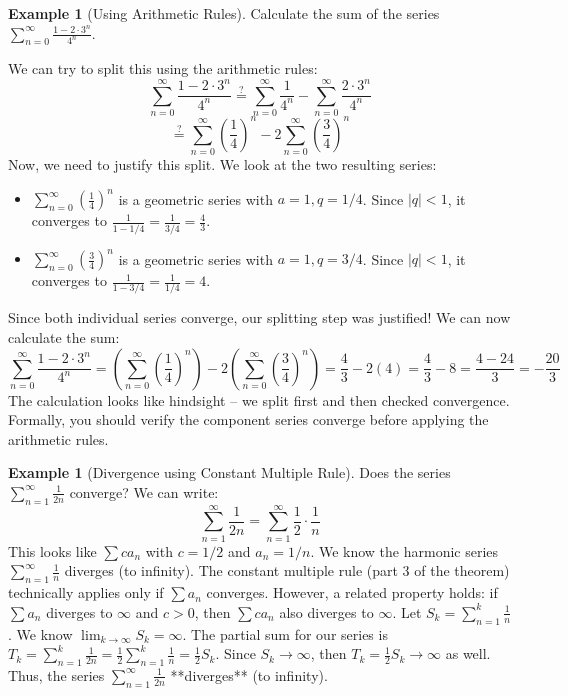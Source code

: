 \documentclass[11pt]{article}
\theoremstyle{definition}
\newtheorem{example}[theorem]{Example}
\theoremstyle{remark}
\begin{document}
\begin{example}[Using Arithmetic Rules]
Calculate the sum of the series $\sum_{n=0}^{\infty} \frac{1 - 2 \cdot 3^n}{4^n}$.

We can try to split this using the arithmetic rules:
\[ \sum_{n=0}^{\infty} \frac{1 - 2 \cdot 3^n}{4^n} \stackrel{?}{=} \sum_{n=0}^{\infty} \frac{1}{4^n} - \sum_{n=0}^{\infty} \frac{2 \cdot 3^n}{4^n} \]
\[ \stackrel{?}{=} \sum_{n=0}^{\infty} \left(\frac{1}{4}\right)^n - 2 \sum_{n=0}^{\infty} \left(\frac{3}{4}\right)^n \]
Now, we need to justify this split. We look at the two resulting series:
\begin{itemize}
    \item $\sum_{n=0}^{\infty} (\frac{1}{4})^n$ is a geometric series with $a=1, q=1/4$. Since $|q|<1$, it converges to $\frac{1}{1-1/4} = \frac{1}{3/4} = \frac{4}{3}$.
    \item $\sum_{n=0}^{\infty} (\frac{3}{4})^n$ is a geometric series with $a=1, q=3/4$. Since $|q|<1$, it converges to $\frac{1}{1-3/4} = \frac{1}{1/4} = 4$.
\end{itemize}
Since both individual series converge, our splitting step was justified! We can now calculate the sum:
\[ \sum_{n=0}^{\infty} \frac{1 - 2 \cdot 3^n}{4^n} = \left( \sum_{n=0}^{\infty} \left(\frac{1}{4}\right)^n \right) - 2 \left( \sum_{n=0}^{\infty} \left(\frac{3}{4}\right)^n \right) = \frac{4}{3} - 2(4) = \frac{4}{3} - 8 = \frac{4 - 24}{3} = -\frac{20}{3} \]
The calculation looks like hindsight – we split first and then checked convergence. Formally, you should verify the component series converge before applying the arithmetic rules.
\end{example}

\begin{example}[Divergence using Constant Multiple Rule]
Does the series $\sum_{n=1}^{\infty} \frac{1}{2n}$ converge?
We can write:
\[ \sum_{n=1}^{\infty} \frac{1}{2n} = \sum_{n=1}^{\infty} \frac{1}{2} \cdot \frac{1}{n} \]
This looks like $\sum c a_n$ with $c = 1/2$ and $a_n = 1/n$.
We know the harmonic series $\sum_{n=1}^{\infty} \frac{1}{n}$ diverges (to infinity).
The constant multiple rule (part 3 of the theorem) technically applies only if $\sum a_n$ converges. However, a related property holds: if $\sum a_n$ diverges to $\infty$ and $c > 0$, then $\sum c a_n$ also diverges to $\infty$.
Let $S_k = \sum_{n=1}^k \frac{1}{n}$. We know $\lim_{k \to \infty} S_k = \infty$.
The partial sum for our series is $T_k = \sum_{n=1}^k \frac{1}{2n} = \frac{1}{2} \sum_{n=1}^k \frac{1}{n} = \frac{1}{2} S_k$.
Since $S_k \to \infty$, then $T_k = \frac{1}{2} S_k \to \infty$ as well.
Thus, the series $\sum_{n=1}^{\infty} \frac{1}{2n}$ **diverges** (to infinity).
\end{example}
\end{document}
